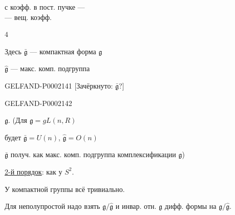\begin{flushright}\begin{minipage}{.55\linewidth}
с коэфф. в пост. пучке ---\\--- вещ. коэфф.
\end{minipage}\end{flushright}





\begin{flushright}$4$\end{flushright}



Здесь $\bar{\mathfrak g}$ --- компактная форма $\mathfrak g$



$\hat{\mathfrak g}$ --- макс. комп. подгруппа



\begin{GelfandAdjacentEvidence}{GELFAND-P000214}{1}
[Зачёркнуто: $\bar{\mathfrak g}$?]
\end{GelfandAdjacentEvidence}
\begin{GelfandAdjacentEvidence}{GELFAND-P000214}{2}

$\mathfrak g$.
(Для $\mathfrak g=gL(n,R)$
\end{GelfandAdjacentEvidence}

будет $\bar{\mathfrak g}=U(n)$, $\hat{\mathfrak g}=O(n)$



$\bar{\mathfrak g}$ получ. как макс. комп. подгруппа комплексификации $\mathfrak g$)



\underline{2-й порядок}: как у $S^2$.



У компактной группы всё тривиально.



Для неполупростой надо взять $\mathfrak g/\hat{\mathfrak g}$ и инвар. отн. $\mathfrak g$ дифф. формы на $\mathfrak g/\hat{\mathfrak g}$.



